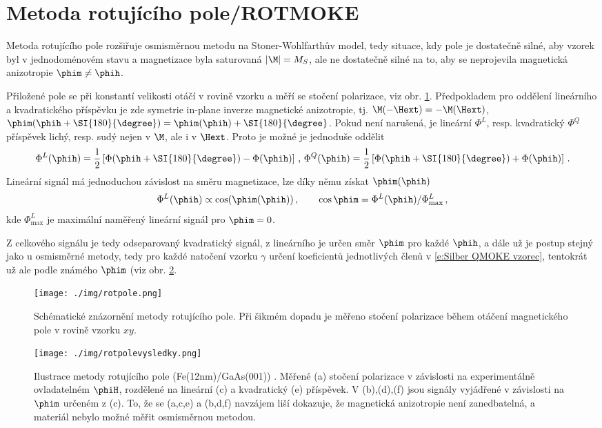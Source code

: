 \section{Metoda rotujícího pole/ROTMOKE}
Metoda rotujícího pole\cite{rotpole1}\cite{rotpole2} rozšiřuje osmisměrnou metodu na Stoner-Wohlfarthův model, tedy situace, kdy pole je dostatečně silné, aby vzorek byl v jednodoménovém stavu a magnetizace byla saturovaná $|\M|=M_S$, ale ne dostatečně silné na to, aby se neprojevila magnetická anizotropie $\phim\neq\phih$.

Přiložené pole se při konstantí velikosti otáčí v rovině vzorku a měří se stočení polarizace, viz obr. \ref{f:rotujici pole}.
Předpokladem pro oddělení lineárního a kvadratického příspěvku je zde symetrie in-plane inverze magnetické anizotropie, tj. $\M(-\Hext)=-\M(\Hext)$, $\phim(\phih+\SI{180}{\degree})=\phim(\phih)+\SI{180}{\degree}$.
Pokud není narušená, je lineární $\Phi^L$, resp. kvadratický $\Phi^Q$ příspěvek lichý, resp. sudý nejen v $\M$, ale i v $\Hext$.
Proto je možné je jednoduše oddělit
\begin{equation}
\Phi^L(\phih)=\frac{1}{2} \left[ \Phi(\phih+\SI{180}{\degree}) - \Phi(\phih) \right] \,, \, \Phi^Q(\phih)=\frac{1}{2} \left[ \Phi(\phih+\SI{180}{\degree}) + \Phi(\phih) \right] \,.
\end{equation}
Lineární signál má jednoduchou závislost na směru magnetizace, lze díky němu získat $\phim(\phih)$
\begin{equation}
    \Phi^L(\phih)\propto \cos(\phim(\phih)) \,, \qquad \cos \phim=\Phi^L(\phih)/\Phi^L_\textrm{max} \,,
\end{equation}
kde $\Phi^L_\textrm{max}$ je maximální naměřený lineární signál pro $\phim=0$.

Z celkového signálu je tedy odseparovaný kvadratický signál, z lineárního je určen směr $\phim$ pro každé $\phih$, a dále už je postup stejný jako u osmisměrné metody, tedy pro každé natočení vzorku $\gamma$ určení koeficientů jednotlivých členů v \eqref{e:Silber QMOKE vzorec}, tentokrát už ale podle známého $\phim$ (viz obr. \ref{f:rotpolevysledky}.

\begin{figure}\center
\texttt{[image: ./img/rotpole.png]}
\caption{Schématické znázornění metody rotujícího pole\cite{rotpole2}. Při šikmém dopadu je měřeno stočení polarizace během otáčení magnetického pole v rovině vzorku $xy$.}\label{f:rotujici pole}
\end{figure}

\begin{figure}
    \centering
    \texttt{[image: ./img/rotpolevysledky.png]}
    \caption{Ilustrace metody rotujícího pole (Fe(12nm)/GaAs(001)) \cite{rotpole2}.
    Měřené (a) stočení polarizace v závislosti na experimentálně ovladatelném $\phiH$, rozdělené na lineární (c) a kvadratický (e) příspěvek. V (b),(d),(f) jsou signály vyjádřené v závislosti na $\phim$ určeném z (c). To, že se (a,c,e) a (b,d,f) navzájem liší dokazuje, že magnetická anizotropie není zanedbatelná, a materiál nebylo možné měřit osmisměrnou metodou.}
    \label{f:rotpolevysledky}
\end{figure}

